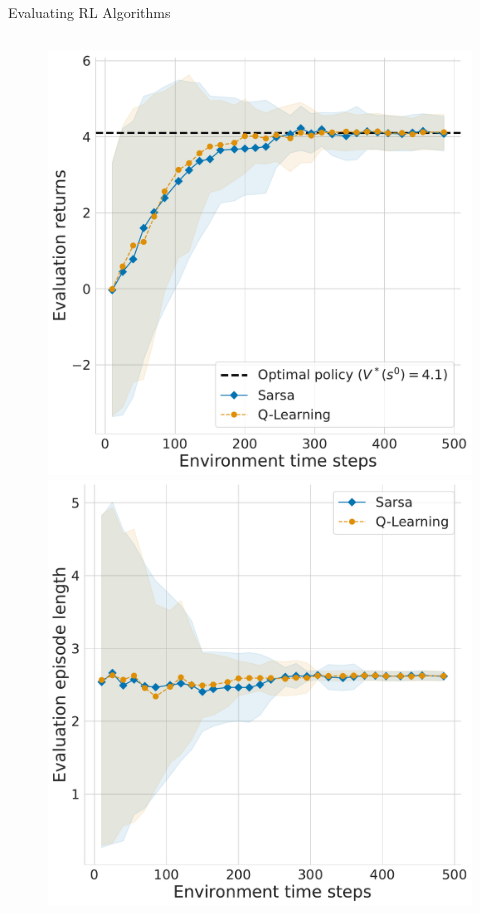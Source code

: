 \begin{frame}{Evaluating RL Algorithms}

    \begin{columns}
    \begin{column}{0.5\textwidth}
        
        \begin{figure}
            \includegraphics[width=0.45\linewidth, height=0.45\textheight, keepaspectratio]{images/chapter_2/tabular_mdp_returns.pdf}
            \hspace{5pt} %
            \includegraphics[width=0.45\linewidth, height=0.45\textheight, keepaspectratio]{images/chapter_2/tabular_mdp_eplength.pdf}
        
            \vspace{5pt} %
        

\end{figure}
\end{column}
\end{columns}
\end{frame}
